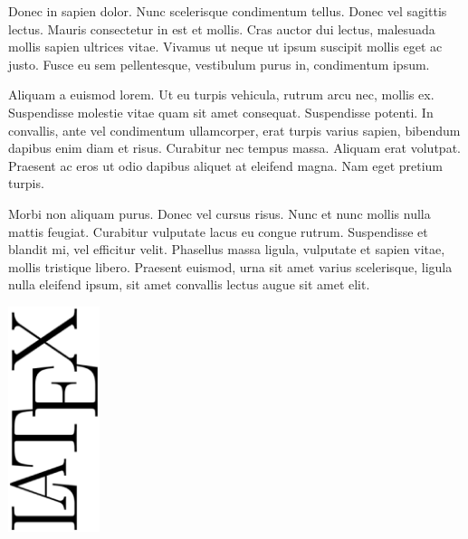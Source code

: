 Donec in sapien dolor. Nunc scelerisque condimentum tellus. Donec vel sagittis lectus. Mauris consectetur in est et mollis. Cras auctor dui lectus, malesuada mollis sapien ultrices vitae. Vivamus ut neque ut ipsum suscipit mollis eget ac justo. Fusce eu sem pellentesque, vestibulum purus in, condimentum ipsum.

Aliquam a euismod lorem. Ut eu turpis vehicula, rutrum arcu nec, mollis ex. Suspendisse molestie vitae quam sit amet consequat. Suspendisse potenti. In convallis, ante vel condimentum ullamcorper, erat turpis varius sapien, bibendum dapibus enim diam et risus. Curabitur nec tempus massa. Aliquam erat volutpat. Praesent ac eros ut odio dapibus aliquet at eleifend magna. Nam eget pretium turpis.

Morbi non aliquam purus. Donec vel cursus risus. Nunc et nunc mollis nulla mattis feugiat. Curabitur vulputate lacus eu congue rutrum. Suspendisse et blandit mi, vel efficitur velit. Phasellus massa ligula, vulputate et sapien vitae, mollis tristique libero. Praesent euismod, urna sit amet varius scelerisque, ligula nulla eleifend ipsum, sit amet convallis lectus augue sit amet elit.


\includegraphics[angle=270,width=0.2\textwidth]{figures/latex.eps}
